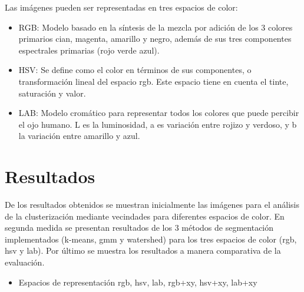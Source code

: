 \documentclass[10pt,twocolumn,letterpaper]{article}
\begin{document}
Las imágenes pueden ser representadas en tres espacios de color:

\begin{itemize}
 \item  RGB: Modelo basado en la síntesis de la mezcla por adición de los 3 colores primarios cian, magenta, amarillo 
y negro, además de sus tres componentes espectrales primarias (rojo verde azul).
\end{itemize}

\begin{itemize}
 \item HSV: Se define como el color en términos de sus componentes, o transformación lineal del espacio rgb. Este espacio tiene en cuenta el tinte, saturación y valor.
\end{itemize}

\begin{itemize}
 \item LAB: Modelo cromático para representar todos los colores que puede percibir el ojo humano. L es la luminosidad, a es variación entre rojizo y verdoso, y b la variación entre amarillo y azul.

\end{itemize}


\section{Resultados}

De los resultados obtenidos se muestran inicialmente las imágenes para el análisis de la clusterización mediante vecindades
para diferentes espacios de color. En segunda medida se presentan resultados de los 3 métodos de segmentación implementados
(k-means, gmm y watershed) para los tres espacios de color (rgb, hsv y lab). Por último se muestra los resultados a manera comparativa de la evaluación.

\begin{itemize}
 \item Espacios de representación rgb, hsv, lab, rgb+xy, hsv+xy,  lab+xy
 \end{itemize} 
\end{document}

